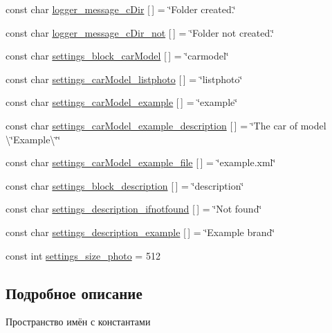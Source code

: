 \begin{DoxyCompactItemize}
\item 
const char \mbox{\hyperlink{namespaceyenot_a674d34d95501a1071db0ac7b39c64f57}{logger\+\_\+message\+\_\+c\+Dir}} \mbox{[}$\,$\mbox{]} = \char`\"{}Folder created.\char`\"{}
\item 
const char \mbox{\hyperlink{namespaceyenot_a16669256cbc1918ac8500a364e0ba21d}{logger\+\_\+message\+\_\+c\+Dir\+\_\+not}} \mbox{[}$\,$\mbox{]} = \char`\"{}Folder not created.\char`\"{}
\item 
const char \mbox{\hyperlink{namespaceyenot_ab685b9f0b8baadc950b69329d1fae577}{settings\+\_\+block\+\_\+car\+Model}} \mbox{[}$\,$\mbox{]} = \char`\"{}carmodel\char`\"{}
\item 
const char \mbox{\hyperlink{namespaceyenot_a0a2414e62514c20e76cf0c522ebf38a3}{settings\+\_\+car\+Model\+\_\+listphoto}} \mbox{[}$\,$\mbox{]} = \char`\"{}listphoto\char`\"{}
\item 
const char \mbox{\hyperlink{namespaceyenot_af238d0e227de22ee3c26114077153efc}{settings\+\_\+car\+Model\+\_\+example}} \mbox{[}$\,$\mbox{]} = \char`\"{}example\char`\"{}
\item 
const char \mbox{\hyperlink{namespaceyenot_a5f4aa342b4a3e3f87069f6fef812594a}{settings\+\_\+car\+Model\+\_\+example\+\_\+description}} \mbox{[}$\,$\mbox{]} = \char`\"{}The car of model \textbackslash{}\char`\"{}Example\textbackslash{}\char`\"{}\char`\"{}
\item 
const char \mbox{\hyperlink{namespaceyenot_acd910e59eb17aa18802af8f4544aab48}{settings\+\_\+car\+Model\+\_\+example\+\_\+file}} \mbox{[}$\,$\mbox{]} = \char`\"{}example.\+xml\char`\"{}
\item 
const char \mbox{\hyperlink{namespaceyenot_aea7e9eb4d5b9e645f22e83e2d5fe893e}{settings\+\_\+block\+\_\+description}} \mbox{[}$\,$\mbox{]} = \char`\"{}description\char`\"{}
\item 
const char \mbox{\hyperlink{namespaceyenot_a53b4bd62fd7a6e3abedfdfb47db53284}{settings\+\_\+description\+\_\+ifnotfound}} \mbox{[}$\,$\mbox{]} = \char`\"{}Not found\char`\"{}
\item 
const char \mbox{\hyperlink{namespaceyenot_a37f90b0081fe0617055470d46489ea0f}{settings\+\_\+description\+\_\+example}} \mbox{[}$\,$\mbox{]} = \char`\"{}Example brand\char`\"{}
\item 
const int \mbox{\hyperlink{namespaceyenot_a4e9a58fa114bcb3d3ae09fb62129f2c9}{settings\+\_\+size\+\_\+photo}} = 512
\end{DoxyCompactItemize}


\subsection{Подробное описание}
Пространство имён с константами 

